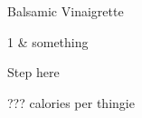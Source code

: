 \begin{recipe}
[ %
    preparationtime = {\unit[???]{?}},
    bakingtime,
    bakingtemperature,
    portion = {\portion{???}},
    calory={???},
]
{Balsamic Vinaigrette}
    
    \graph
    {%
    }
    
    \ingredients
    {%
        1     & something
    }
    
    \preparation
    {%
        \step Step here
    }      
    
    \hint
    {%
        ??? calories per thingie
    }

\end{recipe}